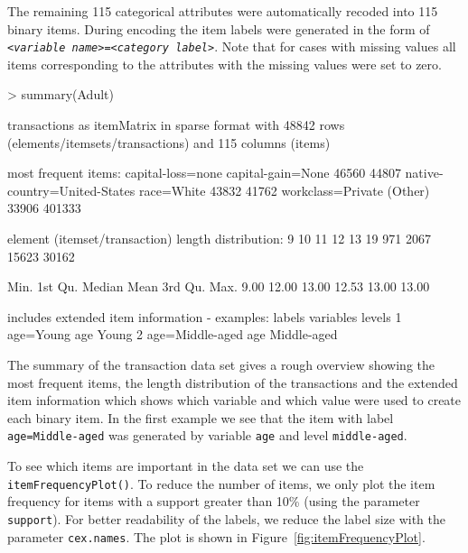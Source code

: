 \documentclass[10pt,a4paper]{article}
\newcommand{\func}[1]{\mbox{\texttt{#1()}}}
\newcommand{\code}[1]{\mbox{\texttt{#1}}}
\begin{document}
The remaining 115 categorical attributes were
automatically recoded into 115
binary items. During encoding the item labels were generated in the
form of 
\texttt{<\emph{variable name}>=<\emph{category label}>}. 
Note that for cases with missing values all items corresponding to the 
attributes with the missing values were set to zero.

\begin{Schunk}
\begin{Sinput}
> summary(Adult)
\end{Sinput}
\begin{Soutput}
transactions as itemMatrix in sparse format with
 48842 rows (elements/itemsets/transactions) and
 115 columns (items)

most frequent items:
           capital-loss=none            capital-gain=None 
                       46560                        44807 
native-country=United-States                   race=White 
                       43832                        41762 
           workclass=Private                      (Other) 
                       33906                       401333 

element (itemset/transaction) length distribution:
    9    10    11    12    13 
   19   971  2067 15623 30162 

   Min. 1st Qu.  Median    Mean 3rd Qu.    Max. 
   9.00   12.00   13.00   12.53   13.00   13.00 

includes extended item information - examples:
           labels variables      levels
1       age=Young       age       Young
2 age=Middle-aged       age Middle-aged
\end{Soutput}
\end{Schunk}

The summary of the transaction data set gives a rough overview showing
the most frequent items, the length distribution of the transactions and
the extended item information which shows which variable and which value
were used to create each binary item. In the first example we see that
the item with label \code{age=Middle-aged} was generated by variable
\code{age} and level \code{middle-aged}.  

To see which items are important in the data set we can use the
\func{itemFrequencyPlot}. To reduce the number of items, we only plot
the item frequency for items with a support greater than 10\% (using the parameter \code{support}).  For
better readability of the labels, we reduce the label size with the
parameter \code{cex.names}. The plot is shown in Figure~\ref{fig:itemFrequencyPlot}.
\end{document}
